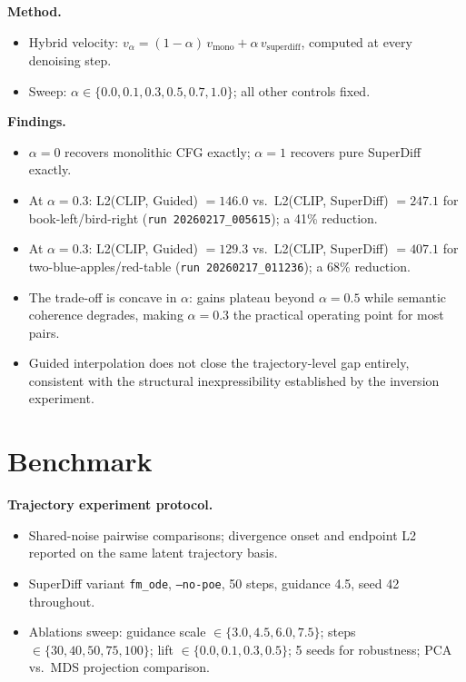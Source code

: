 \documentclass[runningheads]{llncs}
\begin{document}
\textbf{Method.}
\begin{itemize}
  \item Hybrid velocity: $v_\alpha = (1-\alpha)\,v_{\text{mono}} +
    \alpha\,v_{\text{superdiff}}$, computed at every denoising step.
  \item Sweep: $\alpha \in \{0.0, 0.1, 0.3, 0.5, 0.7, 1.0\}$; all other
    controls fixed.
\end{itemize}

\textbf{Findings.}
\begin{itemize}
  \item $\alpha = 0$ recovers monolithic CFG exactly;
    $\alpha = 1$ recovers pure SuperDiff exactly.
  \item At $\alpha = 0.3$: L2(CLIP, Guided) $= 146.0$ vs.\
    L2(CLIP, SuperDiff) $= 247.1$ for book-left/bird-right
    (\texttt{run 20260217\_005615}); a 41\% reduction.
  \item At $\alpha = 0.3$: L2(CLIP, Guided) $= 129.3$ vs.\
    L2(CLIP, SuperDiff) $= 407.1$ for two-blue-apples/red-table
    (\texttt{run 20260217\_011236}); a 68\% reduction.
  \item The trade-off is concave in $\alpha$: gains plateau beyond
    $\alpha = 0.5$ while semantic coherence degrades, making $\alpha = 0.3$
    the practical operating point for most pairs.
  \item Guided interpolation does not close the trajectory-level gap
    entirely, consistent with the structural inexpressibility established
    by the inversion experiment.
\end{itemize}

\section{Benchmark}

\textbf{Trajectory experiment protocol.}
\begin{itemize}
  \item Shared-noise pairwise comparisons; divergence onset and endpoint L2
    reported on the same latent trajectory basis.
  \item SuperDiff variant \texttt{fm\_ode}, \texttt{--no-poe}, 50 steps,
    guidance 4.5, seed 42 throughout.
  \item Ablations sweep: guidance scale $\in \{3.0, 4.5, 6.0, 7.5\}$;
    steps $\in \{30, 40, 50, 75, 100\}$; lift
    $\in \{0.0, 0.1, 0.3, 0.5\}$; 5 seeds for robustness;
    PCA vs.\ MDS projection comparison.
\end{itemize}
\end{document}
